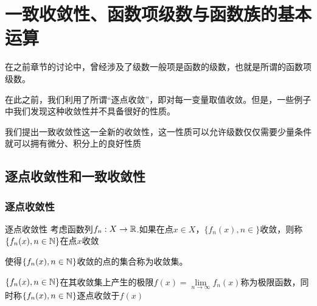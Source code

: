 \documentclass[12pt, a4paper, oneside, UTF8]{ctexbook}
\begin{document}
	\else
	\fi
	
	\chapter{一致收敛性、函数项级数与函数族的基本运算}
	在之前章节的讨论中，曾经涉及了级数一般项是函数的级数，也就是所谓的函数项级数。
	
	在此之前，我们利用了所谓“逐点收敛”，即对每一变量取值收敛。但是，一些例子中我们发现这种收敛性并不具备很好的性质。
	
	我们提出一致收敛性这一全新的收敛性，这一性质可以允许级数仅仅需要少量条件就可以拥有微分、积分上的良好性质
	
	\section{逐点收敛性和一致收敛性}
		\subsection{逐点收敛性}
			\begin{defn}{逐点收敛性}{}
				考虑函数列$f_n : X \to \mathbb{R}$.如果在点$x \in X$，$\{f_n(x),n \in \}$收敛，则称$\{f_n(x),n \in \mathbb{N}\}$在点$x$收敛
				
				使得$\{f_n(x),n \in \mathbb{N}\}$收敛的点的集合称为收敛集。
				
				$\{f_n(x),n \in \mathbb{N}\}$在其收敛集上产生的极限$f(x) = \lim\limits_{n\to\infty}f_n(x)$称为极限函数，同时称$\{f_n(x),n \in \mathbb{N}\}$逐点收敛于$f(x)$
			\end{defn}
	
	\ifx\allfiles\undefined
\end{document}
